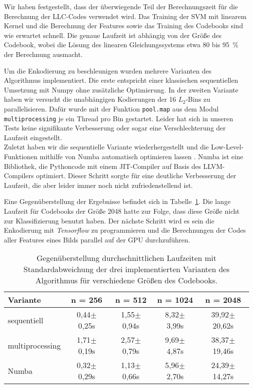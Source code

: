Wir haben festgestellt, dass der überwiegende Teil der Berechnungszeit für die Berechnung der LLC-Codes verwendet wird. Das Training der SVM mit linearem Kernel und die Berechnung der Features sowie das Training des Codebooks sind wie erwartet schnell. Die genaue Laufzeit ist abhängig von der Größe des Codebook, wobei die Lösung des linearen Gleichungssystems etwa 80 bis 95~\% der Berechnung ausmacht.

Um die Enkodierung zu beschleunigen wurden mehrere Varianten des Algorithmus implementiert. Die erste entspricht einer klassischen sequentiellen Umsetzung mit Numpy ohne zusätzliche Optimierung. In der zweiten Variante haben wir versucht die unabhängigen Kodierungen der 16 $L_2$-Bins zu parallelisieren. Dafür wurde mit der Funktion \texttt{pool.map} aus dem Modul \texttt{multiprocessing} je ein Thread pro Bin gestartet. Leider hat sich in unseren Tests keine signifikante Verbesserung oder sogar eine Verschlechterung der Laufzeit eingestellt.\\
Zuletzt haben wir die sequentielle Variante wiederhergestellt und die Low-Level-Funktionen mithilfe von Numba automatisch optimieren lassen \cite{numba}. Numba ist eine Bibliothek, die Pythoncode mit einem JIT-Compiler auf Basis des LLVM-Compilers optimiert. Dieser Schritt sorgte für eine deutliche Verbesserung der Laufzeit, die aber leider immer noch nicht zufriedenstellend ist. 

Eine Gegenüberstellung der Ergebnisse befindet sich in Tabelle~\ref{tab:runtime}. Die lange Laufzeit für Codebooks der Größe 2048 hatte zur Folge, dass diese Größe nicht zur Klassifizierung benutzt haben. Der nächste Schritt wird es sein die Enkodierung mit \emph{Tensorflow} zu programmieren und die Berechnungen der Codes aller Features eines Bilds parallel auf der GPU durchzuführen.

\begin{table}
	\centering
	\begin{tabular}{|l|c|c|c|c|}
		\hline
		\textbf{Variante} & \textbf{n = 256} & \textbf{n = 512} & \textbf{n = 1024} & \textbf{n = 2048} \\ \hline
		sequentiell & 0,44$\pm$0,25s & 1,55$\pm$0,94s & 8,32$\pm$3,99s & 39,92$\pm$20,62s \\ \hline
		multiprocessing & 1,71$\pm$0,19s & 2,57$\pm$0,79s & 9,69$\pm$4,87s & 38,37$\pm$19,46s \\ \hline
		Numba & 0,32$\pm$0,29s & 1,13$\pm$0,66s & 5,96$\pm$2,70s & 24,39$\pm$14,27s \\ \hline
	\end{tabular}
\caption{Gegenüberstellung durchschnittlichen Laufzeiten mit Standardabweichung der drei implementierten Varianten des Algorithmus für verschiedene Größen des Codebooks.}
\label{tab:runtime}
\end{table} 


